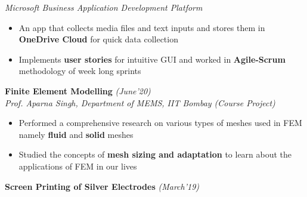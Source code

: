 \documentclass[10.5pt]{article}
\begin{document}
    \vspace{-10pt}
	\hspace{-19pt}
  \textit{Microsoft Business Application Development Platform}

  \vspace{-5pt}
  \begin{itemize}[itemsep = -.5 mm, leftmargin=*]
    \item An app that collects media files and text inputs and stores them in \textbf{OneDrive Cloud} for quick data collection
    
    \item Implements \textbf{user stories} for intuitive GUI and worked in \textbf{Agile-Scrum} methodology of week long sprints 
  \end{itemize}
  
  \vspace{0 pt}
  \hspace{-18 pt}
  \textbf{Finite Element Modelling} \hfill{\sl\small (June'20)}\\
  
  \vspace{-10pt}
	\hspace{-19pt}
  \textit{Prof. Aparna Singh, Department of MEMS, IIT Bombay (Course Project)}
    \vspace{-5pt}
  \begin{itemize}[itemsep = -.5 mm, leftmargin=*]
    \vspace{1pt}
      \item Performed a comprehensive research on various types of meshes used in FEM namely \textbf{fluid} and \textbf{solid} meshes
      \item Studied the concepts of \textbf{mesh sizing and adaptation} to learn about the applications of FEM in our lives
  \end{itemize}
  
  \vspace{0 pt}
  \hspace{-18 pt}
  \textbf{Screen Printing of Silver Electrodes} \hfill{\sl\small (March'19)}\\
  
\end{document}
